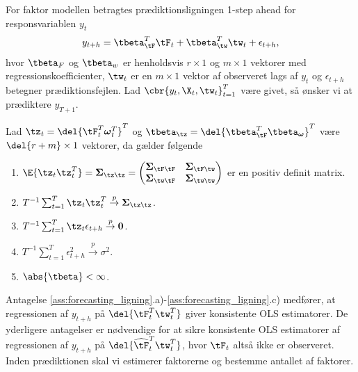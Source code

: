 %
For faktor modellen betragtes prædiktionsligningen 1-step ahead for responsvariablen \(y_t\)
\begin{align}
y_{t+h} = \tbeta_{\tF}^T \tF_t + \tbeta_{\tw}^T \tw_t + \epsilon_{t+h}, \label{eq:factor_model_forecast}
\end{align}
hvor \(\tbeta_F\) og \(\tbeta_w\) er henholdsvis \(r \times 1\) og \(m \times 1\) vektorer med regressionskoefficienter, \(\tw_t\) er en \(m \times 1\) vektor af observeret lags af \(y_t\) og \(\epsilon_{t+h}\) betegner prædiktionsfejlen.
Lad  \(\cbr{y_t, \X_t, \tw_t}_{t=1}^T\) være givet, så ønsker vi at prædiktere \(y_{T+1}\).
%
%
\begin{ass}[Prædiktionsligning] \label{ass:forecasting_ligning}
Lad \(\tz_t = \del{\tF_t^T \boldsymbol{\omega}_t^T}^T\) og \(\tbeta_{\tz} = \del{\tbeta_{\tF}^T \tbeta_{\boldsymbol{\omega}}}^T\) være \(\del{r+m} \times 1\) vektorer, da gælder følgende
\begin{enumerate}[label=\alph*)]
\item \(\E{\tz_t \tz_t^T} = \boldsymbol{\Sigma}_{\tz \tz} = \begin{pmatrix}
\boldsymbol{\Sigma}_{\tF \tF} & \boldsymbol{\Sigma}_{\tF \tw} \\
\boldsymbol{\Sigma}_{\tw \tF} & \boldsymbol{\Sigma}_{\tw \tw}
\end{pmatrix} \) er en positiv definit matrix.
\item \(T^{-1} \sum_{t=1}^T \tz_t \tz_t^T \overset{p}{\rightarrow} \boldsymbol{\Sigma}_{\tz \tz}\).
\item \(T^{-1} \sum_{t=1}^T \tz_t \epsilon_{t+h} \overset{p}{\rightarrow} \mathbf{0}\).
\item  \(T^{-1} \sum_{t=1}^T \epsilon_{t+h}^2 \overset{p}{\rightarrow} \sigma^2\).
\item \(\abs{\tbeta} < \infty\).
\end{enumerate}
\end{ass}
%
Antagelse \ref{ass:forecasting_ligning}.a)-\ref{ass:forecasting_ligning}.c) medfører, at regressionen af \(y_{t+h}\) på \(\del{\tF_t^T \tw_t^T}\) giver konsistente OLS estimatorer.
De yderligere antagelser er nødvendige for at sikre konsistente OLS estimatorer af regressionen af \(y_{t+h}\) på \(\del{\widehat{\tF}_t^T \tw_t^T}\), hvor \(\tF_t\) altså ikke er observeret.
Inden prædiktionen skal vi estimerer faktorerne og bestemme antallet af faktorer.
\newpage

